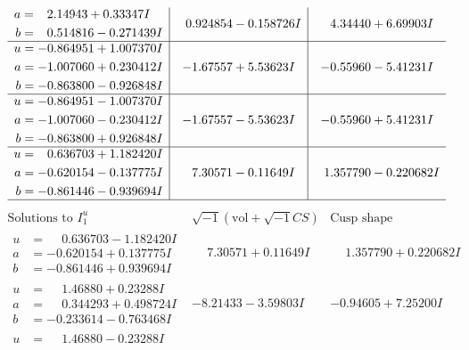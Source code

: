 \documentclass[1p]{elsarticle_modified}
\theoremstyle{definition}
\newcommand{\I}{\sqrt{-1}}
\begin{document}
$$\begin{array}{c|c|c}
\begin{aligned}
a &= \phantom{-}2.14943 + 0.33347 I \\
b &= \phantom{-}0.514816 - 0.271439 I\end{aligned}
 & \phantom{-}0.924854 - 0.158726 I & \phantom{-}4.34440 + 6.69903 I \\ \hline\begin{aligned}
u &= -0.864951 + 1.007370 I \\
a &= -1.007060 + 0.230412 I \\
b &= -0.863800 - 0.926848 I\end{aligned}
 & -1.67557 + 5.53623 I & -0.55960 - 5.41231 I \\ \hline\begin{aligned}
u &= -0.864951 - 1.007370 I \\
a &= -1.007060 - 0.230412 I \\
b &= -0.863800 + 0.926848 I\end{aligned}
 & -1.67557 - 5.53623 I & -0.55960 + 5.41231 I \\ \hline\begin{aligned}
u &= \phantom{-}0.636703 + 1.182420 I \\
a &= -0.620154 - 0.137775 I \\
b &= -0.861446 - 0.939694 I\end{aligned}
 & \phantom{-}7.30571 - 0.11649 I & \phantom{-}1.357790 - 0.220682 I\\
 \hline 
 \end{array}$$\newpage$$\begin{array}{c|c|c}  
\text{Solutions to }I^u_{1}& \I (\text{vol} + \sqrt{-1}CS) & \text{Cusp shape}\\
 \hline 
\begin{aligned}
u &= \phantom{-}0.636703 - 1.182420 I \\
a &= -0.620154 + 0.137775 I \\
b &= -0.861446 + 0.939694 I\end{aligned}
 & \phantom{-}7.30571 + 0.11649 I & \phantom{-}1.357790 + 0.220682 I \\ \hline\begin{aligned}
u &= \phantom{-}1.46880 + 0.23288 I \\
a &= \phantom{-}0.344293 + 0.498724 I \\
b &= -0.233614 - 0.763468 I\end{aligned}
 & -8.21433 - 3.59803 I & -0.94605 + 7.25200 I \\ \hline\begin{aligned}
u &= \phantom{-}1.46880 - 0.23288 I \\

\end{aligned}
\end{array}$$
\end{document}
